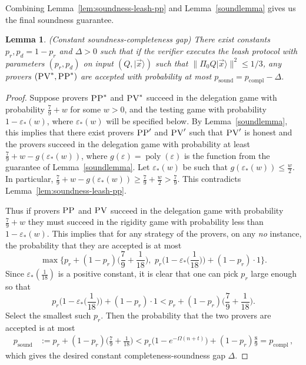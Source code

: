 \documentclass[11pt]{article}
\newtheorem{lemma}[theorem]{Lemma}
\newcommand{\ket}[1]{|#1\rangle}
\DeclareMathOperator{\poly}{poly}
\newcommand{\eps}{\varepsilon}
\newcommand{\pv}{\textsc{PV}}
\newcommand{\pp}{\textsc{PP}}
\begin{document}
\noindent Combining Lemma~\ref{lem:soundness-leash-pp} and Lemma~\ref{soundlemma} gives us the final soundness guarantee.

\begin{lemma}\label{lem:leash-soundness} (Constant soundness-completeness gap)
There exist constants $p_r,p_d=1-p_r$ and $\Delta>0$ such that if the verifier executes the leash protocol with parameters $(p_r,p_d)$ on input $(Q,\ket{\vec{x}})$ such that $\|\Pi_0 Q\ket{\vec{x}}\|^2 \leq 1/3$, any provers $(\pv^*,\pp^*)$ are accepted with probability at most \mbox{$p_{\mathrm{sound}}=p_{\mathrm{compl}}-\Delta$}.  
\end{lemma}

\begin{proof}
Suppose provers $\pp^*$ and $\pv^*$ succeed in the delegation game with probability $\frac79+w$ for some $w>0$, and the testing game with probability $1-\eps_*(w)$, where $\eps_*(w)$ will be specified below. By Lemma~\ref{soundlemma}, this implies that there exist provers $\pp'$ and $\pv'$ such that $\pv'$ is honest and the provers succeed in the delegation game with probability at least $\frac79+w-g(\eps_*(w))$, where $g(\eps) = \poly(\eps)$ is the function from the guarantee of Lemma~\ref{soundlemma}. Let $\eps_*(w)$ be such that $g(\eps_*(w)) \leq \frac{w}{2}$. In particular, $\frac79+w-g(\eps_*(w)) \geq \frac79+\frac{w}{2}>\frac79$. This contradicts Lemma~\ref{lem:soundness-leash-pp}. 

Thus if provers $\pp$ and $\pv$ succeed in the delegation game with probability $\frac79+w$ they must succeed in the rigidity game with probability less than $1-\eps_*(w)$. 
This implies that for any strategy of the provers, on any \textit{no} instance, the probability that they are accepted is at most
\begin{equation}
\max\Big\{p_r+(1-p_r)\Big(\frac79+\frac{1}{18}\Big),\,\, p_r\Big(1-\eps_*\Big(\frac{1}{18}\Big)\Big)+(1-p_r)\cdot 1\Big\}.
\end{equation}
Since $\eps_*(\frac{1}{18})$ is a positive constant, it is clear that one can pick $p_r$ large enough so that 
\begin{equation}
p_r\Big(1-\eps_*\Big(\frac{1}{18}\Big)\Big)+(1-p_r)\cdot 1 < p_r+(1-p_r)\Big(\frac79+\frac{1}{18}\Big).
\end{equation}
Select the smallest such $p_r$. Then the probability that the two provers are accepted is at most 
\begin{align*}
p_{\mathrm{sound}} &:= p_r+(1-p_r)\Big(\frac79+\frac{1}{18}\Big)
< p_r\big(1-e^{-\Omega(n+t)}\big)+(1-p_r)\frac89 
= p_{\mathrm{compl}} \,,
\end{align*}
which gives the desired constant completeness-soundness gap $\Delta$.
\end{proof}
\end{document}
